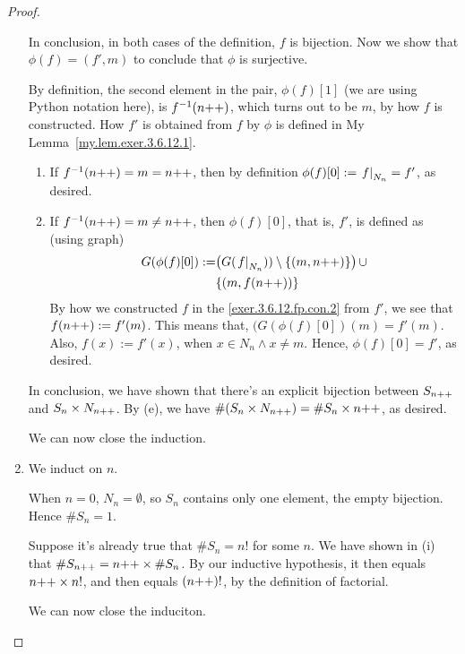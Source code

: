 \begin{proof}
\begin{enumerate}
		In conclusion, in both cases of the definition, $f$ is bijection. Now we show that $\phi(f) = (f', m)$ to conclude that $\phi$ is surjective.

		By definition, the second element in the pair, $\phi(f)[1]$ (we are
		using Python notation here), is $f^{-1}(n{+}{+})$, which turns
		out to be $m$, by how $f$ is constructed.
		How $f'$ is obtained from $f$ by $\phi$ is defined in My Lemma~\ref{my.lem.exer.3.6.12.1}. 
		\begin{enumerate}
			\item If $f^{-1}(n{+}{+}) = m = n{+}{+}$, then by
				definition $\phi(f)[0] := \left.f\right|_{N_n} = f'$, as desired.
			\item If $f^{-1}(n{+}{+}) = m \ne n{+}{+}$, then $\phi(f)[0]$, that is, $f'$, is defined as (using graph)
			\begin{align*}
				G(\phi(f)[0]) := &\bigl(G(\left.f\right|_{N_n})) \setminus \{(m, n{+}{+})\}\bigr)\,\cup \\ 
						 &\{(m, f(n{+}{+}))\}
			\end{align*}
			By how we constructed $f$ in the \ref{exer.3.6.12.fp.con.2} from $f'$, we see that $f(n{+}{+}) := f'(m)$. This means that,
			$(G(\phi(f)[0])(m) = f'(m)$. Also, $f(x) := f'(x)$, when $x \in N_n \land x \ne m$. Hence, $\phi(f)[0] = f'$, as desired.
		\end{enumerate}

		In conclusion, we have shown that there's an explicit bijection between $S_{n{+}{+}}$ and $S_n \times N_{n{+}{+}}$. By
		 (e), we have $\#(S_n \times N_{n{+}{+}}) = \#S_n \times n{+}{+}$, as desired.

		We can now close the induction.

	\item 
		We induct on $n$.

		\mybcbox When $n = 0$, $N_n = \emptyset$, so $S_n$ contains only one element, the empty bijection. Hence $\#S_n = 1$.

		\myisbox Suppose it's already true that $\#S_n = n!$ for some $n$. We have shown in (i) that $\#S_{n{+}{+}} = n{+}{+} \times \#S_n$.
		By our inductive hypothesis, it then equals $n{+}{+} \times n!$, and then equals $(n{+}{+})!$, by the definition of factorial.

		We can now close the induciton.

\end{enumerate}
\end{proof}
